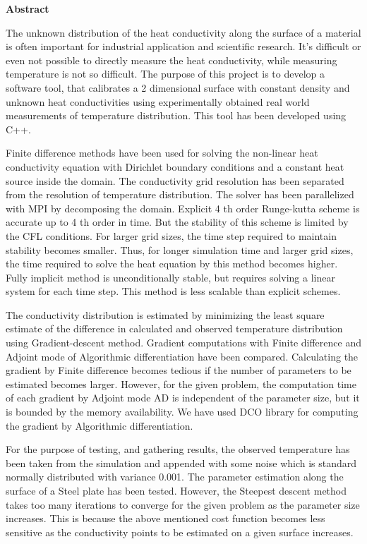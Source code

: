 \documentclass[10pt,a4paper]{report}
\begin{document}
{
\thispagestyle{empty}
\normalsize
\begin{center}
{\large \textbf{Abstract}}
\end{center}
The unknown distribution of the heat conductivity along the surface of a material is often important for industrial application and scientific research. It’s difficult or even not possible to directly measure the heat conductivity, while measuring temperature is not so difficult. The purpose of this project is to develop a software tool, that calibrates a 2 dimensional surface with constant density and unknown heat conductivities using experimentally obtained real world measurements of temperature distribution. This tool has been developed using C++.


Finite difference methods have been used for solving the non-linear heat conductivity equation with Dirichlet boundary conditions and a constant heat source inside the domain. The conductivity grid resolution has been separated from the resolution of temperature distribution. The solver has been parallelized with MPI by decomposing the domain. Explicit 4 th order Runge-kutta scheme is accurate up to 4 th order in time. But the stability of this scheme is limited by the CFL conditions. For larger grid sizes, the time step required to maintain stability becomes smaller. Thus, for longer simulation time and larger grid sizes, the time required to solve the heat equation by this method becomes higher. Fully implicit method is unconditionally stable, but requires solving a linear system for each time step. This method is less scalable than explicit schemes.


The conductivity distribution is estimated by minimizing the least square estimate of the difference in calculated and observed temperature distribution using Gradient-descent method. Gradient computations with Finite difference and Adjoint mode of Algorithmic differentiation have been compared. Calculating the gradient by Finite difference becomes tedious if the number of parameters to be estimated becomes larger. However, for the given problem, the computation time of each gradient by Adjoint mode AD is independent of the parameter size, but it is bounded by the memory availability. We have used DCO library for computing the gradient by Algorithmic differentiation.


For the purpose of testing, and gathering results, the observed temperature has been taken from the simulation and appended with some noise which is standard normally distributed with variance 0.001. The parameter estimation along the surface of a Steel plate has been tested. However, the Steepest descent method takes too many iterations to converge for the given problem as the parameter size increases. This is because the above mentioned cost function becomes less sensitive as the conductivity points to be estimated on a given surface increases.

}
\end{document}
